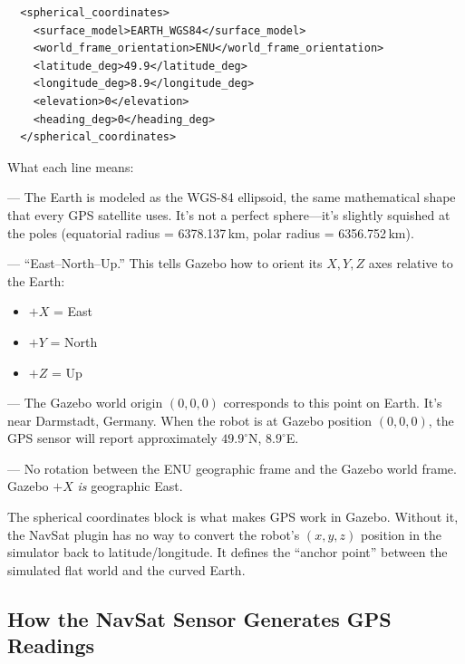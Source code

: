 \documentclass[11pt,a4paper]{article}
\begin{document}
\begin{verbatim}
  <spherical_coordinates>
    <surface_model>EARTH_WGS84</surface_model>
    <world_frame_orientation>ENU</world_frame_orientation>
    <latitude_deg>49.9</latitude_deg>
    <longitude_deg>8.9</longitude_deg>
    <elevation>0</elevation>
    <heading_deg>0</heading_deg>
  </spherical_coordinates>
\end{verbatim}

What each line means:

\begin{description}[leftmargin=2em]
  \item[\texttt{EARTH\_WGS84}] --- The Earth is modeled as the WGS-84
    ellipsoid, the same mathematical shape that every GPS satellite uses.
    It's not a perfect sphere---it's slightly squished at the poles
    (equatorial radius = 6378.137\,km, polar radius = 6356.752\,km).

  \item[\texttt{ENU}] --- ``East--North--Up.'' This tells Gazebo how to
    orient its $X, Y, Z$ axes relative to the Earth:
    \begin{itemize}
      \item $+X$ = East
      \item $+Y$ = North
      \item $+Z$ = Up
    \end{itemize}

  \item[\texttt{latitude=49.9, longitude=8.9}] --- The Gazebo world origin
    $(0, 0, 0)$ corresponds to this point on Earth. It's near Darmstadt,
    Germany. When the robot is at Gazebo position $(0, 0, 0)$, the GPS sensor
    will report approximately $49.9^\circ$N, $8.9^\circ$E.

  \item[\texttt{heading=0}] --- No rotation between the ENU geographic frame
    and the Gazebo world frame. Gazebo $+X$ \emph{is} geographic East.
\end{description}

\begin{keyidea}
The spherical coordinates block is what makes GPS work in Gazebo. Without it,
the NavSat plugin has no way to convert the robot's $(x, y, z)$ position in
the simulator back to latitude/longitude. It defines the ``anchor point''
between the simulated flat world and the curved Earth.
\end{keyidea}

\subsection{How the NavSat Sensor Generates GPS Readings}
\end{document}
